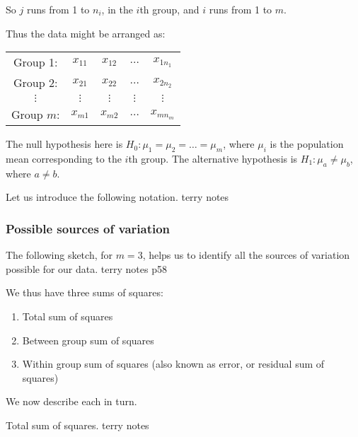 \documentclass[12pt]{article}
\begin{document}
So $j$ runs from 1 to $n_i$, in the $i$th group, and $i$ runs from 1 to $m$.

Thus the data might be arranged as:
\begin{center}
\begin{tabular}{ccccc}
  Group 1: & $x_{11}$ & $x_{12}$ & $\ldots$ & $x_{1n_{1}}$ \\
  Group 2: & $x_{21}$ & $x_{22}$ & $\ldots$ & $x_{2n_{2}}$ \\
  $\vdots$ & $\vdots$ & $\vdots$ & $\vdots$ & $\vdots$ \\
  Group $m$: & $x_{m1}$ & $x_{m2}$ & $\ldots$ & $x_{mn_{m}}$ \\
\end{tabular}
\end{center}
The null hypothesis here is $H_{0}: \mu_{1}=\mu_{2}=\ldots=\mu_{m}$, where $\mu_{i}$ is the population mean corresponding to the $i$th group. The alternative hypothesis is $H_{1}:\mu_{a}\neq\mu_{b}$, where $a\neq b$.

\begin{mdframed}
Let us introduce the following notation.
\textcolor[rgb]{1.00,1.00,1.00}{terry notes\lipsum[1-8]}
\end{mdframed}

\subsubsection{Possible sources of variation}

\begin{mdframed}
The following sketch, for $m=3$, helps us to identify all the sources of variation possible for our data.
\textcolor[rgb]{1.00,1.00,1.00}{terry notes p58\lipsum[1-4]}
\end{mdframed}

We thus have three sums of squares:
\begin{enumerate}
\item Total sum of squares
\item Between group sum of squares
\item Within group sum of squares (also known as error, or residual sum of squares)
\end{enumerate}
We now describe each in turn.

\begin{mdframed}
Total sum of squares.
\textcolor[rgb]{1.00,1.00,1.00}{terry notes\lipsum[1-6]}
\end{mdframed}
\end{document}
